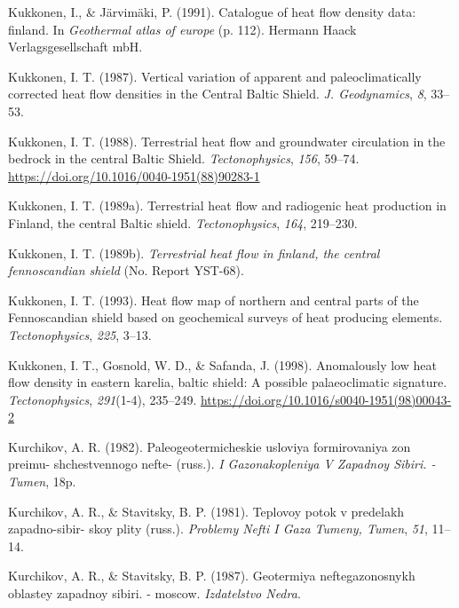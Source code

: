 \begin{CSLReferences}{1}{1}
\leavevmode{}%
Kukkonen, I., \& Järvimäki, P. (1991). Catalogue of heat flow density data: finland. In \emph{Geothermal atlas of europe} (p. 112). Hermann Haack Verlagsgesellschaft mbH.

\leavevmode{}%
Kukkonen, I. T. (1987). Vertical variation of apparent and paleoclimatically corrected heat flow densities in the {Central Baltic Shield}. \emph{J. Geodynamics}, \emph{8}, 33--53.

\leavevmode{}%
Kukkonen, I. T. (1988). Terrestrial heat flow and groundwater circulation in the bedrock in the central {Baltic Shield}. \emph{Tectonophysics}, \emph{156}, 59--74. \url{https://doi.org/10.1016/0040-1951(88)90283-1}

\leavevmode{}%
Kukkonen, I. T. (1989a). Terrestrial heat flow and radiogenic heat production in {Finland}, the central {Baltic} shield. \emph{Tectonophysics}, \emph{164}, 219--230.

\leavevmode{}%
Kukkonen, I. T. (1989b). \emph{Terrestrial heat flow in finland, the central fennoscandian shield} (No. Report YST-68).

\leavevmode{}%
Kukkonen, I. T. (1993). Heat flow map of northern and central parts of the {Fennoscandian} shield based on geochemical surveys of heat producing elements. \emph{Tectonophysics}, \emph{225}, 3--13.

\leavevmode{}%
Kukkonen, I. T., Gosnold, W. D., \& Safanda, J. (1998). Anomalously low heat flow density in eastern karelia, baltic shield: A possible palaeoclimatic signature. \emph{Tectonophysics}, \emph{291}(1-4), 235--249. \url{https://doi.org/10.1016/s0040-1951(98)00043-2}

\leavevmode{}%
Kurchikov, A. R. (1982). Paleogeotermicheskie usloviya formirovaniya zon preimu- shchestvennogo nefte- (russ.). \emph{I Gazonakopleniya V Zapadnoy Sibiri. - Tumen}, 18p.

\leavevmode{}%
Kurchikov, A. R., \& Stavitsky, B. P. (1981). Teplovoy potok v predelakh zapadno-sibir- skoy plity (russ.). \emph{Problemy Nefti I Gaza Tumeny, Tumen}, \emph{51}, 11--14.

\leavevmode{}%
Kurchikov, A. R., \& Stavitsky, B. P. (1987). Geotermiya neftegazonosnykh oblastey zapadnoy sibiri. - moscow. \emph{Izdatelstvo Nedra}.


\end{CSLReferences}
